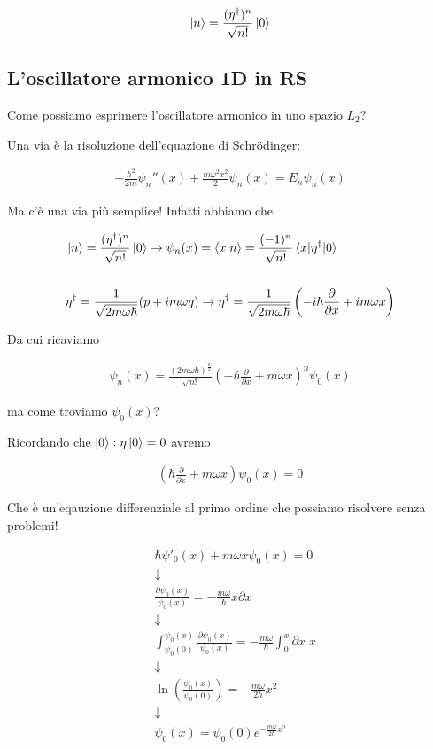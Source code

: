 \begin{align}
\ket{n}= \frac{(\eta^\dagger)^n}{\sqrt{n!}}\ket{0}
\end{align}


\subsection{L'oscillatore armonico 1D in RS}

Come possiamo esprimere l'oscillatore armonico in uno spazio $L_2$?

Una via è la risoluzione dell'equazione di Schrödinger:

\begin{align}
-\frac{\hbar^2}{2m}\psi_n''(x)+\frac{m\omega^2x^2}{2}\psi_n(x)=E_n\psi_n(x) 
\end{align}

Ma c'è una via più semplice! Infatti abbiamo che

\begin{align}
{}&\ket{n}= \frac{(\eta^\dagger)^n}{\sqrt{n!}}\ket{0} \rightarrow \psi_n(x)= \braket{x|n}= \frac{(-1)^n}{\sqrt{n!}}\braket{x|\eta^\dagger|0} \\
\nonumber \\
&\eta^\dagger = \frac{1}{\sqrt{2m\omega\hbar}}(p + im\omega q) \rightarrow \eta^\dagger= \frac{1}{\sqrt{2m\omega\hbar}} \left( -i\hbar \frac{\partial}{\partial x} + im\omega x \right)
\end{align}

Da cui ricaviamo

\begin{align}
\psi_n(x)= \frac{(2m\omega \hbar)^{\frac{n}{2}}}{\sqrt{n!}}\left( -\hbar \frac{\partial}{\partial x} + m\omega x \right)^n \psi_0(x)
\end{align}


ma come troviamo $\psi_0(x)$?

Ricordando che $\ket{0}: \eta\ket{0}=0$ avremo

\begin{align}
\left( \hbar \frac{\partial}{\partial x} + m\omega x \right) \psi_0(x) =0
\end{align}

Che è un'eqauzione differenziale al primo ordine che possiamo risolvere senza problemi!

\begin{align}
{}&\hbar \psi'_0(x) + m\omega x \psi_0(x)=0 \nonumber \\
& \downarrow \nonumber \\
& \frac{\partial \psi_0(x)}{\psi_0(x)} = -\frac{m\omega}{\hbar} x \partial x  \nonumber \\
& \downarrow \nonumber \\
& \int_{\psi_0(0)}^{\psi_0(x)} \frac{\partial \psi_0(x)}{\psi_0(x)} = -\frac{m\omega}{\hbar} \int_{0}^{x} \partial x \; x  \nonumber \\
& \downarrow \nonumber \\
& \ln(\frac{\psi_0(x)}{\psi_0(0)}) = -\frac{m\omega}{2\hbar}x^2 \nonumber \\
& \downarrow \nonumber \\
& \psi_0(x) = \psi_0(0) e^{-\frac{m\omega}{2\hbar}x^2}
\end{align}

